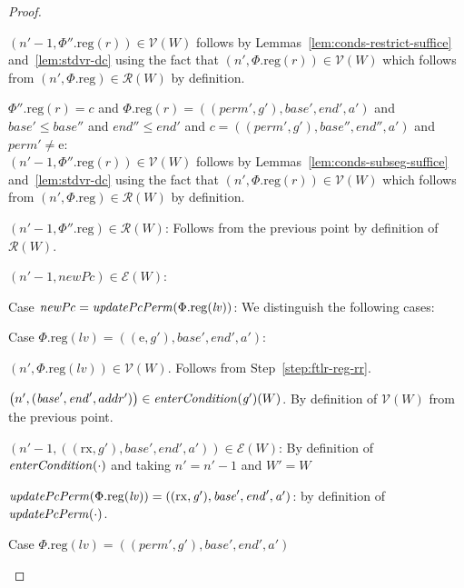 \documentclass[a4paper]{article}
\newcommand{\var}[1]{\mathit{#1}}
\newcommand{\lv}{\var{lv}}
\newcommand{\gl}{\var{g}}
\newcommand{\addr}{\var{a}}
\newcommand{\start}{\var{base}}
\newcommand{\addrend}{\var{end}}
\newcommand{\perm}{\var{perm}}
\newcommand{\plainproj}[1]{\mathrm{#1}}
\newcommand{\memreg}[1][\Phi]{#1.\plainproj{reg}}
\newcommand{\plainfun}[2]{
  \ifthenelse{\equal{#2}{}}
  {\mathit{#1}}
  {\mathit{#1}(#2)}
}
\newcommand{\updatePcPerm}[1]{\plainfun{updatePcPerm}{#1}}
\newcommand{\entryCond}[1]{\plainfun{enterCondition}{#1}}
\newcommand{\asmType}{\plaindom{AsmType}}
\newcommand{\plaindom}[1]{\mathrm{#1}}
\newcommand{\intr}[2]{\mathcal{#1}}
\newcommand{\valueintr}[1]{\intr{V}{#1}}
\newcommand{\exprintr}[1]{\intr{E}{#1}}
\newcommand{\regintr}[1]{\intr{R}{#1}}
\newcommand{\stdvr}{\valueintr{\asmType}}
\newcommand{\stder}{\exprintr{\asmType}}
\newcommand{\stdrr}{\regintr{\asmType}}
\newcommand{\npair}[2][n]{\left(#1,#2 \right)}
\newcommand{\plainperm}[1]{\mathrm{#1}}
\newcommand{\exec}{\plainperm{rx}}
\newcommand{\entry}{\plainperm{e}}
\begin{document}
\begin{proof}
\begin{enumproof}
\begin{enumproof}
\begin{enumproof}
        $\npair[n'-1]{\memreg[\Phi''](r)} \in \stdvr(W)$ follows by
        Lemmas~\ref{lem:conds-restrict-suffice} and~\ref{lem:stdvr-dc} using the
        fact that $\npair[n']{\memreg(r)}\in\stdvr(W)$
        which follows from $\npair[n']{\memreg}\in\stdrr(W)$ by
        definition.
      \item $\memreg[\Phi''](r) = \var{c}$ and $\memreg(r) =
        ((\perm',\gl'),\start',\addrend',\addr')$ and $\start' \leq \start''$ and
        $\addrend'' \leq \addrend'$ and $c =
        ((\perm',\gl'),\start'',\addrend'',\addr')$ and $\perm' \neq \entry$: \\
        $\npair[n'-1]{\memreg[\Phi''](r)} \in \stdvr(W)$ follows by
        Lemmas~\ref{lem:conds-subseg-suffice} and~\ref{lem:stdvr-dc} using the
        fact that $\npair[n']{\memreg(r)}\in\stdvr(W)$
        which follows from $\npair[n']{\memreg}\in\stdrr(W)$ by definition.
      \end{enumproof}
    \item $\npair[n'-1]{\memreg[\Phi'']}\in\stdrr(W)$: Follows from the previous
      point by definition of $\stdrr(W)$.
    \item $\npair[n'-1]{\var{newPc}} \in \stder(W)$:
      \begin{enumproof}
      \item Case $\var{newPc}= \updatePcPerm{\memreg(\lv)}$: We distinguish the
        following cases:
        \begin{enumproof}
        \item Case $\memreg(\lv) = ((\entry,\gl'),\start',\addrend',\addr')$:
          \begin{enumproof}
          \item $\npair[n']{\memreg(\lv)} \in \stdvr(W)$.  Follows from
            Step~\ref{step:ftlr-reg-rr}.
          \item $\npair[n']{(\start',\addrend',addr')} \in \entryCond{\gl'}(W)$.
            By definition of $\stdvr(W)$ from the previous point.
          \item $\npair[n'-1]{((\exec,\gl'),\start',\addrend',\addr')} \in
            \stder(W)$: By definition of $\entryCond{\cdot}$ and taking $n' =
            n'-1$ and $W' = W$
          \item $\updatePcPerm{\memreg(\lv)} =
            ((\exec,\gl'),\start',\addrend',\addr')$: by definition of $\updatePcPerm{\cdot}$.
          \end{enumproof}
        \item Case $\memreg(\lv) = ((\perm',\gl'),\start',\addrend',\addr')$

\end{enumproof}
\end{enumproof}
\end{enumproof}
\end{enumproof}
\end{proof}
\end{document}
